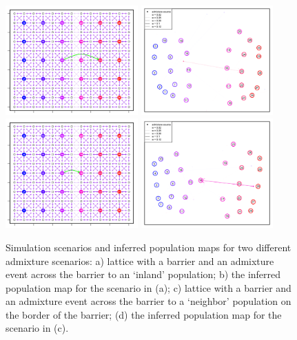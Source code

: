 \documentclass[12pt]{article}
\newcommand{\plr}[1]{{\it\color{green}{(#1)}}}
\begin{document}
\begin{figure}[htp!]
	\centering
			{\includegraphics[width=2in,height=1.66in]{figs/sims/barr_indland_ad_lattice.png}}
			{\includegraphics[width=2in,height=1.66in]{figs/sims/GeoGenMap_barr_inland_admixture_1.png}}
			{\includegraphics[width=2in,height=1.66in]{figs/sims/big_barr_ad_lattice.png}}
			{\includegraphics[width=2in,height=1.66in]{figs/sims/GeoGenMap_big_barr_ad_1.png}}
	\caption{
    Simulation scenarios and inferred population maps for two different admixture scenarios: a) lattice with a barrier and an admixture event across the barrier to an `inland' population; b) the inferred population map for the scenario in (a); c) lattice with a barrier and an admixture event across the barrier to a `neighbor' population on the border of the barrier; (d) the inferred population map for the scenario in (c).
    \plr{somehow label admixture arrows by their strength?}
}\label{sfig:barr_inland_ad}
\end{figure}
\end{document}
